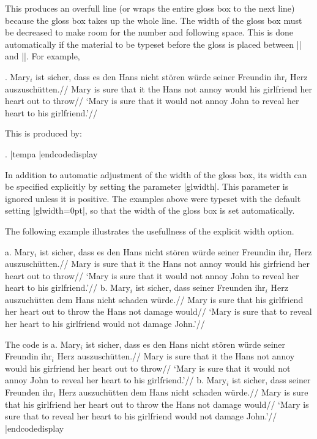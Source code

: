 \noindent This produces an overfull line (or wraps the entire gloss box to
the next line) because the gloss box takes up the whole line. The
width of the gloss box must be decreased to make room for the
number and following space. This is done automatically if the
material to be typeset before the gloss is placed between
|\begingl| and |\gla|.  For example,

\framedisplay
\exdisplay
{}.\quad
\gla Mary$_i$ ist sicher, dass es den Hans nicht st\"oren w\"urde
seiner Freundin ihr$_i$ Herz auszusch\"utten.//
\glb Mary is sure that it the Hans not annoy would
his girlfriend her heart
{out to throw}//
\glft  `Mary is sure that it would not annoy John to reveal her
heart to his girlfriend.'//
\endgl
\xe
\endframedisplay

This is produced by:

\edef\tempa{{%
   \twelverm\quad$\vdots$\quad
      \raise2pt\hbox{(as in the code for Example ??? above)}\par}}
\codedisplay
{}.\quad
\gla
|tempa
\endgl
|endcodedisplay

In addition to automatic adjustment of the width of the gloss
box, its width can be specified explicitly by setting the
parameter |glwidth|.  This parameter is ignored unless it is
positive.  The examples above were typeset with the default
setting |glwidth=0pt|, so that the width of the gloss box is
set automatically.

The following example illustrates the usefullness of the explicit
width option.

\ex
a.\quad
\begingl[glwidth=2.6in]
\gla Mary$_i$ ist sicher, dass es den Hans nicht st\"oren w\"urde
seiner Freundin ihr$_i$ Herz auszusch\"utten.//
\glb Mary is sure that it the Hans not annoy would
his girfriend her heart {out to
throw}//
\glft  `Mary is sure that it would not annoy John to reveal her
heart to his girlfriend.'//
\endgl
\hfil
b.\quad
\begingl[glwidth=2.6in]
\gla Mary$_i$ ist sicher, dass seiner Freunden ihr$_i$ Herz
auszuch\"utten dem Hans nicht schaden w\"urde.//
\glb Mary is sure that his girlfriend her
heart {out to throw} the Hans not damage would//
\glft `Mary is sure that to reveal her heart to his girlfriend
would not damage John.'//
\endgl
\xe

The code is
\codedisplay
\ex
a.\quad
\begingl[glwidth=2.6in]
\gla Mary$_i$ ist sicher, dass es den Hans nicht st\"oren w\"urde
seiner Freundin ihr$_i$ Herz auszusch\"utten.//
\glb Mary is sure that it the Hans not annoy would
his girfriend her heart {out to
throw}//
\glft  `Mary is sure that it would not annoy John to reveal her
heart to his girlfriend.'//
\endgl
\hfil
b.\quad
\begingl[glwidth=2.6in]
\gla Mary$_i$ ist sicher, dass seiner Freunden ihr$_i$ Herz
auszuch\"utten dem Hans nicht schaden w\"urde.//
\glb Mary is sure that his girlfriend her
heart {out to throw} the Hans not damage would//
\glft `Mary is sure that to reveal her heart to his girlfriend
would not damage John.'//
\endgl
\xe
|endcodedisplay


